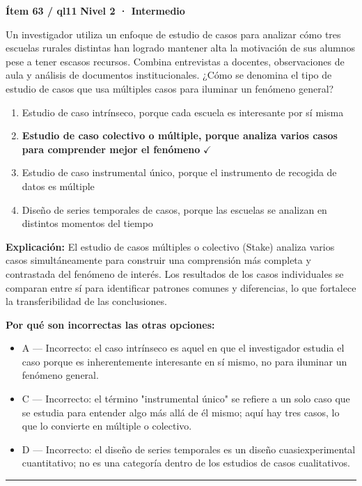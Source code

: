 \documentclass[12pt,a4paper]{article}
\begin{document}
\begin{mdframed}[backgroundcolor=fondogris,linecolor=ambar,linewidth=1pt,innerleftmargin=10pt,innerrightmargin=10pt,innertopmargin=7pt,innerbottommargin=7pt]
\textbf{Ítem 63 / ql11} \hfill {\small\bfseries\color{ambar} Nivel 2 · Intermedio}
\end{mdframed}

Un investigador utiliza un enfoque de estudio de casos para analizar cómo tres escuelas rurales distintas han logrado mantener alta la motivación de sus alumnos pese a tener escasos recursos. Combina entrevistas a docentes, observaciones de aula y análisis de documentos institucionales. ¿Cómo se denomina el tipo de estudio de casos que usa múltiples casos para iluminar un fenómeno general?

\begin{enumerate}
  \item[A.] Estudio de caso intrínseco, porque cada escuela es interesante por sí misma
  \item[\textbf{\color{verde}B.}] \textbf{\color{verde} Estudio de caso colectivo o múltiple, porque analiza varios casos para comprender mejor el fenómeno} \hfill $\checkmark$
  \item[C.] Estudio de caso instrumental único, porque el instrumento de recogida de datos es múltiple
  \item[D.] Diseño de series temporales de casos, porque las escuelas se analizan en distintos momentos del tiempo
\end{enumerate}

\noindent\textbf{\color{azul}Explicación:} El estudio de casos múltiples o colectivo (Stake) analiza varios casos simultáneamente para construir una comprensión más completa y contrastada del fenómeno de interés. Los resultados de los casos individuales se comparan entre sí para identificar patrones comunes y diferencias, lo que fortalece la transferibilidad de las conclusiones.

\noindent\textbf{\color{gris}Por qué son incorrectas las otras opciones:}
\begin{itemize}
  \item {\small A — Incorrecto: el caso intrínseco es aquel en que el investigador estudia el caso porque es inherentemente interesante en sí mismo, no para iluminar un fenómeno general.}
  \item {\small C — Incorrecto: el término "instrumental único" se refiere a un solo caso que se estudia para entender algo más allá de él mismo; aquí hay tres casos, lo que lo convierte en múltiple o colectivo.}
  \item {\small D — Incorrecto: el diseño de series temporales es un diseño cuasiexperimental cuantitativo; no es una categoría dentro de los estudios de casos cualitativos.}
\end{itemize}
\vspace{8pt}\hrule\vspace{10pt}
\end{document}
